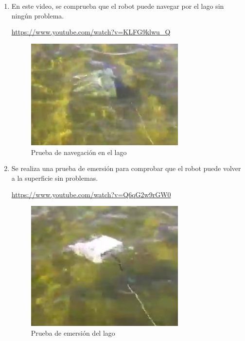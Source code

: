\begin{enumerate}
\item En este video, se comprueba que el robot puede navegar por el lago sin ningún problema.
\begin{center}
\url{https://www.youtube.com/watch?v=KLFG9klwu_Q}
\end{center}

 \begin{figure} [hbtp]
  \begin{center}
    \includegraphics[width=8cm]{img/cap5/navegacion}
  \end{center}
  \caption{Prueba de navegación en el lago}
  \label{fig:navegacion}
 \end{figure}

\newpage
\item Se realiza una prueba de emersión para comprobar que el robot puede volver a la superficie sin problemas.
\begin{center}
\url{https://www.youtube.com/watch?v=Q6qG2w9rGW0}
\end{center}

 \begin{figure} [hbtp]
  \begin{center}
    \includegraphics[width=8cm]{img/cap5/emersion}
  \end{center}
  \caption{Prueba de emersión del lago}
  \label{fig:emersion}
 \end{figure}


\end{enumerate}
